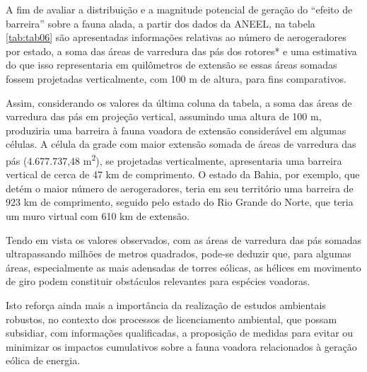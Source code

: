 \documentclass[
  oneside]{scrbook}
\begin{document}
\begin{blackbox}
A fim de avaliar a distribuição e a magnitude potencial de geração do ``efeito de barreira'' sobre a fauna alada, a partir dos dados da ANEEL, na tabela \ref{tab:tab06} são apresentadas informações relativas ao número de aerogeradores por estado, a soma das áreas de varredura das pás dos rotores* e uma estimativa do que isso representaria em quilômetros de extensão se essas áreas somadas fossem projetadas verticalmente, com 100 m de altura, para fins comparativos.

Assim, considerando os valores da última coluna da tabela, a soma das áreas de varredura das pás em projeção vertical, assumindo uma altura de 100 m, produziria uma barreira à fauna voadora de extensão considerável em algumas células. A célula da grade com maior extensão somada de áreas de varredura das pás (4.677.737,48 m\textsuperscript{2}), se projetadas verticalmente, apresentaria uma barreira vertical de cerca de 47 km de comprimento. O estado da Bahia, por exemplo, que detém o maior número de aerogeradores, teria em seu território uma barreira de 923 km de comprimento, seguido pelo estado do Rio Grande do Norte, que teria um muro virtual com 610 km de extensão.

Tendo em vista os valores observados, com as áreas de varredura das pás somadas ultrapassando milhões de metros quadrados, pode-se deduzir que, para algumas áreas, especialmente as mais adensadas de torres eólicas, as hélices em movimento de giro podem constituir obstáculos relevantes para espécies voadoras.

Isto reforça ainda mais a importância da realização de estudos ambientais robustos, no contexto dos processos de licenciamento ambiental, que possam subsidiar, com informações qualificadas, a proposição de medidas para evitar ou minimizar os impactos cumulativos sobre a fauna voadora relacionados à geração eólica de energia.

\end{blackbox}

\newpage
\end{document}
